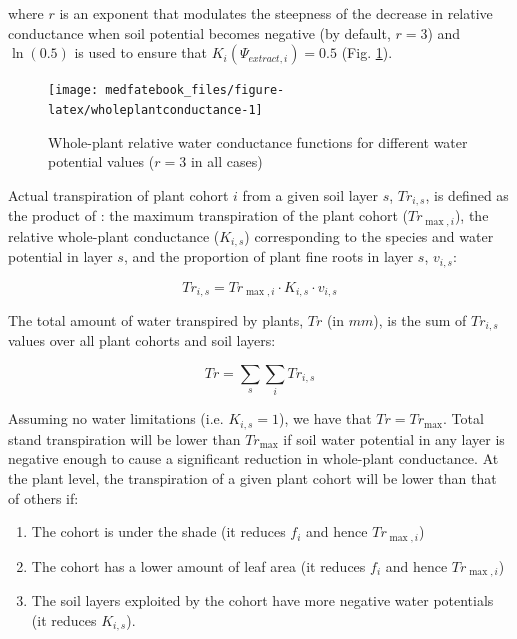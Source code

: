 \documentclass[]{book}
\providecommand{\tightlist}{%
  \setlength{\itemsep}{0pt}\setlength{\parskip}{0pt}}
\begin{document}
where \(r\) is an exponent that modulates the steepness of the decrease
in relative conductance when soil potential becomes negative (by
default, \(r = 3\)) and \(\ln(0.5)\) is used to ensure that
\(K_{i}(\Psi_{extract,i}) = 0.5\) (Fig.
\ref{fig:wholeplantconductance}).




\begin{figure}

{\centering \texttt{[image: medfatebook\_files/figure-latex/wholeplantconductance-1]} 

}

\caption{Whole-plant relative water conductance
functions for different water potential values (\(r = 3\) in all cases)}\label{fig:wholeplantconductance}
\end{figure}

Actual transpiration of plant cohort \(i\) from a given soil layer
\(s\), \(Tr_{i,s}\), is defined as the product of \citep{Mouillot2001}:
the maximum transpiration of the plant cohort (\(Tr_{\max,i}\)), the
relative whole-plant conductance (\(K_{i,s}\)) corresponding to the
species and water potential in layer \(s\), and the proportion of plant
fine roots in layer \(s\), \(v_{i,s}\):

\begin{equation}
Tr_{i,s} =  Tr_{\max,i} \cdot K_{i,s} \cdot v_{i,s}
\end{equation}

The total amount of water transpired by plants, \(Tr\) (in \(mm\)), is
the sum of \(Tr_{i,s}\) values over all plant cohorts and soil layers:

\begin{equation}
Tr =\sum_{s}\sum_{i}{Tr_{i,s}}
\end{equation}

Assuming no water limitations (i.e. \(K_{i,s} = 1\)), we have that
\(Tr = Tr_{\max}\). Total stand transpiration will be lower than
\(Tr_{\max}\) if soil water potential in any layer is negative enough to
cause a significant reduction in whole-plant conductance. At the plant
level, the transpiration of a given plant cohort will be lower than that
of others if:

\begin{enumerate}
\def\labelenumi{\alph{enumi}.}
\tightlist
\item
  The cohort is under the shade (it reduces \(f_i\) and hence
  \(Tr_{\max,i}\))
\item
  The cohort has a lower amount of leaf area (it reduces \(f_i\) and
  hence \(Tr_{\max,i}\))
\item
  The soil layers exploited by the cohort have more negative water
  potentials (it reduces \(K_{i,s}\)).
\end{enumerate}
\end{document}
